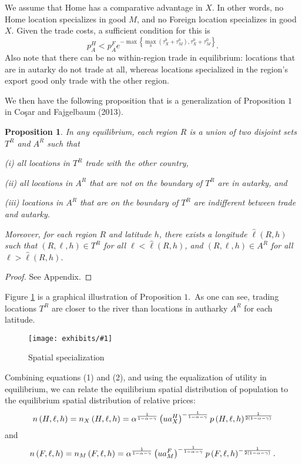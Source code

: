 \documentclass[12pt]{article}
\newtheorem{proposition}{Proposition}
\newcommand{\dofigure}[2]{\begin{figure}[h!]
\center %
\texttt{[image: exhibits/\#1]}
\caption{#2\label{fig:#1}}
\end{figure}}
\begin{document}
We assume that Home has a comparative advantage in $X$. In other words, no Home location specializes in good $M$, and no Foreign
location specializes in good $X$. Given the trade costs, 
a sufficient condition for this is%
\begin{equation*}
p_{A}^{H}<p_{A}^{F}e^{-\max \left \{ \max_{b}\left( \tau _{X}^{b}+\tau
_{M}^{b}\right) ,\tau _{X}^{0}+\tau _{M}^{0}\right \} }.
\end{equation*}%
Also note that there can be no within-region trade in equilibrium:
locations that are in autarky do not trade at all, whereas locations
specialized in the region's export good only trade with the other region.

We then have the following proposition that is a generalization of
Proposition $1$ in Co\c{s}ar and Fajgelbaum (2013).

\begin{proposition}
In any equilibrium, each region $R$ is a union of two disjoint sets 
$T^{R}$ and $A^{R}$ such that

(i) all locations in $T^{R}$ trade with the other country,

(ii) all locations in $A^{R}$ that are not on the boundary of $T^{R}$
are in autarky, and

(iii) locations in $A^{R}$ that are on the boundary of $T^{R}$ are
indifferent between trade and autarky.

Moreover, for each region $R$ and latitude $h$, there exists a longitude $%
\widehat{\ell }\left( R,h\right) $ such that $\left( R,\ell ,h\right) \in
T^{R}$ for all $\ell <\widehat{\ell }\left( R,h\right) $, and $\left( R,\ell
,h\right) \in A^{R}$ for all $\ell >\widehat{\ell }\left( R,h\right) $.
\end{proposition}

\begin{proof}
See Appendix.
\end{proof}

Figure \ref{fig:figurem2} is a graphical illustration of Proposition $1$.\
As one can see, trading locations $T^{R}$ are closer to the
river than locations in autharky $A^{R}$ for each latitude.

\dofigure{figurem2}{Spatial specialization}

Combining equations (1) and (2), and using the equalization of utility in
equilibrium, we can relate the equilibrium spatial distribution of
population to the equilibrium spatial distribution of relative prices:%
\begin{equation}
n\left( H,\ell ,h\right) =n_{X}\left( H,\ell ,h\right) =\alpha ^{\frac{1}{%
1-\alpha-\gamma }}\left( u a_{X}^{H}\right) ^{-\frac{1}{1-\alpha-\gamma }}p\left(
H,\ell ,h\right) ^{\frac{1}{2\left( 1-\alpha-\gamma \right) }}
\end{equation}%
and%
\begin{equation}
n\left( F,\ell ,h\right) =n_{M}\left( F,\ell ,h\right) =\alpha ^{\frac{1}{%
1-\alpha-\gamma }}\left( u a_{M}^{F}\right) ^{-\frac{1}{1-\alpha-\gamma }}p\left(
F,\ell ,h\right) ^{-\frac{1}{2\left( 1-\alpha-\gamma \right) }}.
\end{equation}
\end{document}

